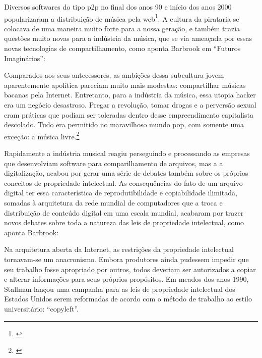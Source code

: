 Diversos softwares do tipo p2p no final dos anos 90 e início dos anos 2000 popularizaram a distribuição de música pela web\footnote{\cite{Castro2008}}.  A cultura da pirataria se colocava de uma maneira muito forte para a nossa geração, e também trazia questões muito novas para a indústria da música, que se via ameaçada por essas novas tecnologias de compartilhamento, como aponta Barbrook em ``Futuros Imaginários'':
    
\begin{citacao}
Comparados aos seus antecessores, as ambições dessa subcultura jovem aparentemente apolítica pareciam muito mais modestas: compartilhar músicas bacanas pela Internet. Entretanto, para a indústria da música, essa utopia hacker era um negócio desastroso. Pregar a revolução, tomar drogas e a perversão sexual eram práticas que podiam ser toleradas dentro desse empreendimento capitalista descolado. Tudo era permitido no maravilhoso mundo pop, com somente uma exceção: a música livre.\footnote{\cite[370]{Barbrook2009}}
\end{citacao}

Rapidamente a indústria musical reagiu perseguindo e processando as empresas que desenvolviam software para comparilhamento de arquivos, mas a a digitalização, acabou por gerar uma série de debates também sobre os próprios conceitos de propriedade intelectual. As consequências do fato de um arquivo digital ter essa característica de reprodutibilidade e copiabilidade ilimitada, somadas à arquitetura da rede mundial de computadores que a troca e distribuição de conteúdo digital em uma escala mundial, acabaram por trazer novos debates sobre toda a natureza das leis de propriedade intelectual, como aponta Barbrook:


\begin{citacao}
Na arquitetura aberta da Internet, as restrições da propriedade intelectual tornavam-se um anacronismo. Embora produtores ainda pudessem impedir que seu trabalho fosse apropriado por outros, todos deveriam ser autorizados a copiar e alterar informações para seus próprios propósitos. Em meados dos anos 1990, Stallman lançou uma campanha para as leis de propriedade intelectual dos Estados Unidos serem reformadas de acordo com o método de trabalho ao estilo universitário: “copyleft”. \cite[368]{Barbrook2009} \citeyear{Barbrook2009}
\end{citacao}

